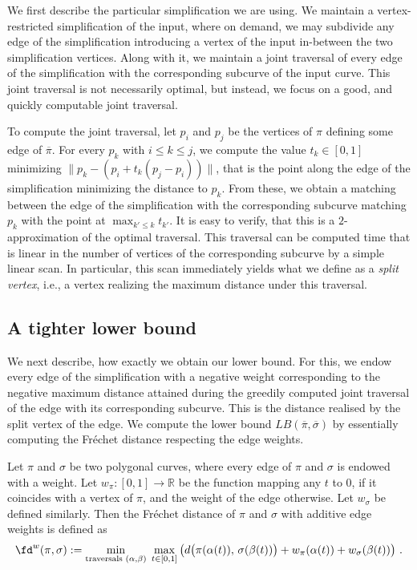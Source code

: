 \documentclass[english, thm-restate, notab]{lipics-v2021}
\begin{document}
We first describe the particular simplification we are using. We maintain a vertex-restricted simplification of the input, where on demand, we may subdivide any edge of the simplification introducing a vertex of the input in-between the two simplification vertices. Along with it, we maintain a joint traversal of every edge of the simplification with the corresponding subcurve of the input curve. This joint traversal is not necessarily optimal, but instead, we focus on a good, and quickly computable joint traversal. 

To compute the joint traversal, let $p_i$ and $p_j$ be the vertices of $\pi$ defining some edge of $\overline{\pi}$. For every $p_k$ with $i\leq k\leq j$, we compute the value $t_k\in[0,1]$ minimizing $\|p_k-(p_i+t_k(p_j-p_i))\|$, that is the point along the edge of the simplification minimizing the distance to $p_k$. From these, we obtain a matching between the edge of the simplification with the corresponding subcurve matching $p_k$ with the point at $\max_{k'\leq k}t_{k'}$. It is easy to verify, that this is a $2$-approximation of the optimal traversal. 
This traversal can be computed time that is linear in the number of vertices of the corresponding subcurve by a simple linear scan. In particular, this scan immediately yields what we define as a \emph{split vertex}, i.e., a vertex realizing the maximum distance under this traversal.

\subsection{A tighter lower bound}

We next describe, how exactly we obtain our lower bound. For this, we endow every edge of the simplification with a negative weight corresponding to the negative maximum distance attained during the greedily computed joint traversal of the edge with its corresponding subcurve. This is the distance realised by the split vertex of the edge.  We compute the lower bound $LB(\overline{\pi},\overline{\sigma})$ by essentially computing the Fréchet distance respecting the edge weights. 

\begin{definition}
    Let $\pi$ and $\sigma$ be two polygonal curves, where every edge of $\pi$ and $\sigma$ is endowed with a weight. Let $w_\pi:[0,1]\rightarrow\mathbb{R}$ be the function mapping any $t$ to $0$, if it coincides with a vertex of $\pi$, and the weight of the edge otherwise. Let $w_\sigma$ be defined similarly. Then the Fréchet distance of $\pi$ and $\sigma$ with additive edge weights is defined as
    \[\fd^w(\pi,\sigma):= \min\limits_{\text{traversals } (\alpha,\beta)}\;
           \max\limits_{t \in [0,1]}\left( d\bigl( \pi(\alpha(t)),\, \sigma(\beta(t)) \bigr) + w_\pi(\alpha(t)) + w_\sigma(\beta(t))\right)\, .\]
\end{definition}
\end{document}
